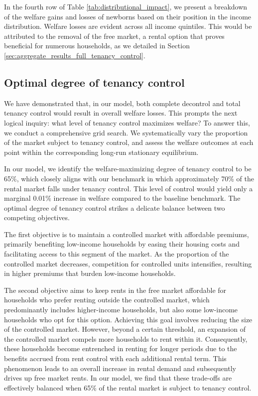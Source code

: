 \documentclass[parskip=full]{article}
\begin{document}
In the fourth row of Table \ref{tab:distributional_impact}, we present a breakdown of the welfare gains and losses of newborns based on their position in the income distribution. Welfare losses are evident across all income quintiles. This would be attributed to the removal of the free market, a rental option that proves beneficial for numerous households, as we detailed in Section \ref{sec:aggregate_results_full_tenancy_control}.

\subsection{Optimal degree of tenancy control}\label{subsection:optimal_control}

We have demonstrated that, in our model, both complete decontrol and total tenancy control would result in overall welfare losses. This prompts the next logical inquiry: what level of tenancy control maximizes welfare? To answer this, we conduct a comprehensive grid search. We systematically vary the proportion of the market subject to tenancy control, and assess the welfare outcomes at each point within the corresponding long-run stationary equilibrium.

In our model, we identify the welfare-maximizing degree of tenancy control to be 65\%, which closely aligns with our benchmark in which approximately 70\% of the rental market falls under tenancy control. This level of control would yield only a marginal 0.01\% increase in welfare compared to the baseline benchmark. The optimal degree of tenancy control strikes a delicate balance between two competing objectives.

The first objective is to maintain a controlled market with affordable premiums, primarily benefiting low-income households by easing their housing costs and facilitating access to this segment of the market. As the proportion of the controlled market decreases, competition for controlled units intensifies, resulting in higher premiums that burden low-income households.

The second objective aims to keep rents in the free market affordable for households who prefer renting outside the controlled market, which predominantly includes higher-income households, but also some low-income households who opt for this option. Achieving this goal involves reducing the size of the controlled market. However, beyond a certain threshold, an expansion of the controlled market compels more households to rent within it. Consequently, these households become entrenched in renting for longer periods due to the benefits accrued from rent control with each additional rental term. This phenomenon leads to an overall increase in rental demand and subsequently drives up free market rents. In our model, we find that these trade-offs are effectively balanced when 65\% of the rental market is subject to tenancy control.
\end{document}
